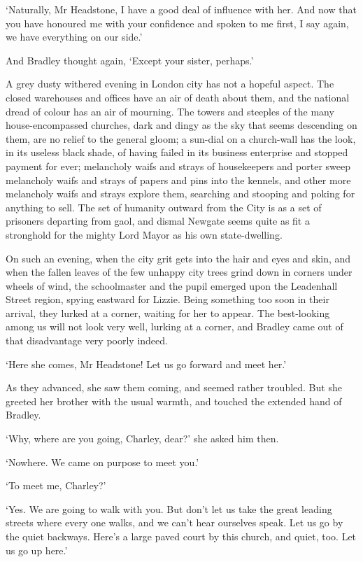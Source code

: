 ‘Naturally, Mr Headstone, I have a good deal of influence with her.
And now that you have honoured me with your confidence and spoken to me
first, I say again, we have everything on our side.’

And Bradley thought again, ‘Except your sister, perhaps.’

A grey dusty withered evening in London city has not a hopeful aspect.
The closed warehouses and offices have an air of death about them, and
the national dread of colour has an air of mourning. The towers and
steeples of the many house-encompassed churches, dark and dingy as the
sky that seems descending on them, are no relief to the general gloom;
a sun-dial on a church-wall has the look, in its useless black shade, of
having failed in its business enterprise and stopped payment for ever;
melancholy waifs and strays of housekeepers and porter sweep melancholy
waifs and strays of papers and pins into the kennels, and other more
melancholy waifs and strays explore them, searching and stooping and
poking for anything to sell. The set of humanity outward from the City
is as a set of prisoners departing from gaol, and dismal Newgate
seems quite as fit a stronghold for the mighty Lord Mayor as his own
state-dwelling.

On such an evening, when the city grit gets into the hair and eyes and
skin, and when the fallen leaves of the few unhappy city trees grind
down in corners under wheels of wind, the schoolmaster and the pupil
emerged upon the Leadenhall Street region, spying eastward for Lizzie.
Being something too soon in their arrival, they lurked at a corner,
waiting for her to appear. The best-looking among us will not look very
well, lurking at a corner, and Bradley came out of that disadvantage
very poorly indeed.

‘Here she comes, Mr Headstone! Let us go forward and meet her.’

As they advanced, she saw them coming, and seemed rather troubled. But
she greeted her brother with the usual warmth, and touched the extended
hand of Bradley.

‘Why, where are you going, Charley, dear?’ she asked him then.

‘Nowhere. We came on purpose to meet you.’

‘To meet me, Charley?’

‘Yes. We are going to walk with you. But don’t let us take the great
leading streets where every one walks, and we can’t hear ourselves
speak. Let us go by the quiet backways. Here’s a large paved court by
this church, and quiet, too. Let us go up here.’

